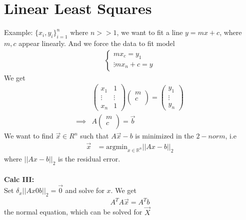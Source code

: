 \documentclass[11pt,oneside]{book}
\theoremstyle{break}
\theoremstyle{break}
\newcommand{\R}{\mathbb{R}}
\newcommand{\example}{\color{purple}Example: \color{black}}
\begin{document}
\chapter[Linear Least Squares]{Linear Least Squares}
\example $\{x_i,y_i\}_{i=1}^n$ where $n>>1$, we want to fit a line $y=mx+c$, where $m,c$ appear linearly. And we force the data to fit model \begin{align*}
\begin{cases}
mx_c=y_1\\
\vdots
mx_n+c=y
\end{cases}
\end{align*}
We get \begin{align*}
&\begin{pmatrix}
x_1 &1\\
\vdots &\vdots\\
x_n&1
\end{pmatrix}\begin{pmatrix}
m\\
c\\
\end{pmatrix}=\begin{pmatrix}
y_1\\
\vdots\\
y_n
\end{pmatrix}\\
\implies& A\begin{pmatrix}
m\\
c\\
\end{pmatrix}=\vec{b}
\end{align*}
We want to find $\vec{x}\in R^n$ such that $A\vec{x}-b$ is minimized in the $2-norm$, i.e \begin{align*}
\vec{x}&=\text{argmin}_{x\in \R^n}||Ax-b||_2
\end{align*}
where $||Ax-b||_2$ is the residual error.\\
\hfill\\
\textbf{Calc III:}\\
Set $\delta_x||Ax0b||_2=\vec{0}$ and solve for $x.$ We get \begin{align*}
A^TA\vec{x}=A^Tb
\end{align*}
the normal equation, which can be solved for $\vec{X}$\\
\end{document}

